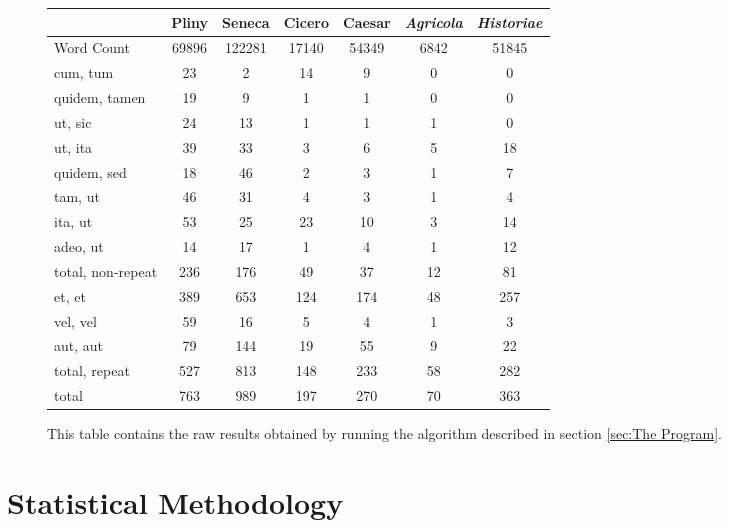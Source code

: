 \begin{figure*}[t]
  \begin{center}
    \begin{tabular}{| l || c | c | c | c | c | c |}
      \hline
      & Pliny & Seneca & Cicero & Caesar & \textit{Agricola} & \textit{Historiae}  \\ \hline \hline
      Word Count & 69896 & 122281 & 17140 & 54349 & 6842 & 51845 \\ \hline \hline
      cum, tum & 23 & 2 & 14 & 9 & 0 & 0 \\ \hline
      quidem, tamen & 19 & 9 & 1 & 1 & 0 & 0 \\ \hline
      ut, sic & 24 & 13 & 1 & 1 & 1 & 0 \\ \hline
      ut, ita & 39 & 33 & 3 & 6 & 5 & 18 \\ \hline
      quidem, sed & 18 & 46 & 2 & 3 & 1 & 7 \\ \hline
      tam, ut & 46 & 31 & 4 & 3 & 1 & 4 \\ \hline
      ita, ut & 53 & 25 & 23 & 10 & 3 & 14 \\ \hline
      adeo, ut & 14 & 17 & 1 & 4 & 1 & 12 \\ \hline \hline
      total, non-repeat & 236 & 176 & 49 & 37 & 12 & 81 \\ \hline \hline
      et, et & 389 & 653 & 124 & 174 & 48 & 257 \\ \hline
      vel, vel & 59 & 16 & 5 & 4 & 1 & 3 \\ \hline
      aut, aut & 79 & 144 & 19 & 55 & 9 & 22 \\ \hline \hline
      total, repeat & 527 & 813 & 148 & 233 & 58 & 282 \\ \hline \hline
      total & 763 & 989 & 197 & 270 & 70 & 363 \\
      \hline
    \end{tabular}
  \end{center}
  \caption{\label{fig:results}This table contains the raw results obtained by running the algorithm described in section \ref{sec:The Program}.}
\end{figure*}

\section{Statistical Methodology}
\label{sec:stats}

